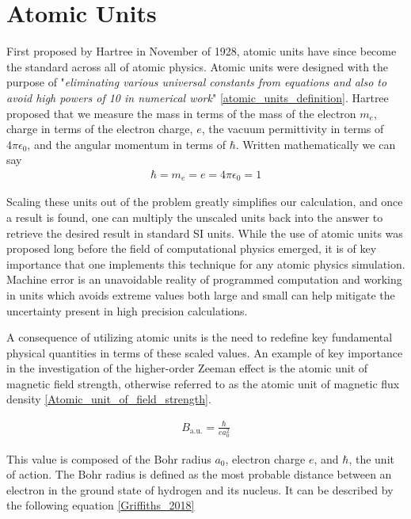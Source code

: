     \section{Atomic Units} \label{sec:atomic_units}    
        First proposed by Hartree in November of 1928, atomic units have since become the standard across all of atomic physics. Atomic units were designed with the purpose of "\textit{eliminating various universal constants from equations and also to avoid high powers of 10 in numerical work}" \ref{atomic_units_definition}. Hartree proposed that we measure the mass in terms of the mass of the electron $m_e$, charge in terms of the electron charge, $e$, the vacuum permittivity in terms of $4\pi \epsilon_0$, and the angular momentum in terms of $\hbar$. Written mathematically we can say
        \begin{align}
            \hbar = m_e = e = 4\pi \epsilon_0 = 1
        \end{align}

        \noindent Scaling these units out of the problem greatly simplifies our calculation, and once a result is found, one can multiply the unscaled units back into the answer to retrieve the desired result in standard SI units. While the use of atomic units was proposed long before the field of computational physics emerged, it is of key importance that one implements this technique for any atomic physics simulation. Machine error is an unavoidable reality of programmed computation and working in units which avoids extreme values both large and small can help mitigate the uncertainty present in high precision calculations.

        A consequence of utilizing atomic units is the need to redefine key fundamental physical quantities in terms of these scaled values. An example of key importance in the investigation of the higher-order Zeeman effect is the atomic unit of magnetic field strength, otherwise referred to as the atomic unit of magnetic flux density \ref{Atomic_unit_of_field_strength}.

        \begin{align}
            B_{\text{a.u.}} = \frac{\hbar}{e a_0^2}
        \end{align}

        This value is composed of the Bohr radius $a_0$, electron charge $e$, and $\hbar$, the unit of action. The Bohr radius is defined as the most probable distance between an electron in the ground state of hydrogen and its nucleus. It can be described by the following equation \ref{Griffiths_2018}

